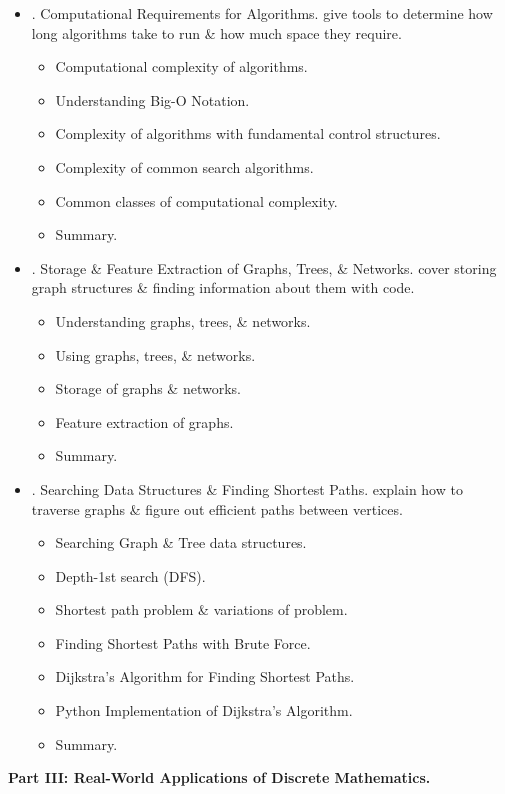 \documentclass{article}
\begin{document}
\begin{enumerate}
\begin{itemize}
		\item {. Computational Requirements for Algorithms.} give tools to determine how long algorithms take to run \& how much space they require.
		\begin{itemize}
			\item {\sf Computational complexity of algorithms.}
			\item {\sf Understanding Big-O Notation.}
			\item {\sf Complexity of algorithms with fundamental control structures.}
			\item {\sf Complexity of common search algorithms.}
			\item {\sf Common classes of computational complexity.}
			\item {\sf Summary.}
		\end{itemize}
		\item {. Storage \& Feature Extraction of Graphs, Trees, \& Networks.} cover storing graph structures \& finding information about them with code.
		\begin{itemize}
			\item {\sf Understanding graphs, trees, \& networks.}
			\item {\sf Using graphs, trees, \& networks.}
			\item {\sf Storage of graphs \& networks.}
			\item {\sf Feature extraction of graphs.}
			\item {\sf Summary.}
		\end{itemize}
		\item {. Searching Data Structures \& Finding Shortest Paths.} explain how to traverse graphs \& figure out efficient paths between vertices.
		\begin{itemize}
			\item {\sf Searching Graph \& Tree data structures.}
			\item {\sf Depth-1st search (DFS).}
			\item {\sf Shortest path problem \& variations of problem.}
			\item {\sf Finding Shortest Paths with Brute Force.}
			\item {\sf Dijkstra's Algorithm for Finding Shortest Paths.}
			\item {\sf Python Implementation of Dijkstra's Algorithm.}
			\item {\sf Summary.}
		\end{itemize}
	\end{itemize}
	{\bf Part III: Real-World Applications of Discrete Mathematics.}

\end{enumerate}
\end{document}
